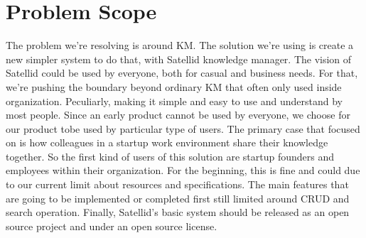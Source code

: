 \section{Problem Scope}
\label{sec:problem-scope}

The problem we're resolving is around \ac{KM}.
The solution we're using is create a new simpler system to do that, with Satellid knowledge manager.
The vision of Satellid could be used by everyone, both for casual and business needs.
For that, we're pushing the boundary beyond ordinary \ac{KM} that often only used inside organization.
Peculiarly, making it simple and easy to use and understand by most people.
Since an early product cannot be used by everyone, we choose for our product tobe used by particular type of users.
The primary case that focused on is how colleagues in a startup work environment share their knowledge together.
So the first kind of users of this solution are startup founders and employees within their organization.
For the beginning, this is fine and could due to our current limit about resources and specifications.
The main features that are going to be implemented or completed first still limited around \ac{CRUD} and search operation.
Finally, Satellid's basic system should be released as an open source project and under an open source license.
